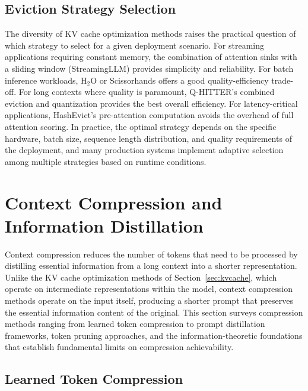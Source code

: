 \documentclass[11pt,letterpaper]{article}
\begin{document}
\subsection{Eviction Strategy Selection}

The diversity of KV cache optimization methods raises the practical question of which strategy to select for a given deployment scenario. For streaming applications requiring constant memory, the combination of attention sinks with a sliding window (StreamingLLM) provides simplicity and reliability. For batch inference workloads, H$_2$O or Scissorhands offers a good quality-efficiency trade-off. For long contexts where quality is paramount, Q-HITTER's combined eviction and quantization provides the best overall efficiency. For latency-critical applications, HashEvict's pre-attention computation avoids the overhead of full attention scoring. In practice, the optimal strategy depends on the specific hardware, batch size, sequence length distribution, and quality requirements of the deployment, and many production systems implement adaptive selection among multiple strategies based on runtime conditions.


\section{Context Compression and Information Distillation}
\label{sec:compression}

Context compression reduces the number of tokens that need to be processed by distilling essential information from a long context into a shorter representation. Unlike the KV cache optimization methods of Section~\ref{sec:kvcache}, which operate on intermediate representations within the model, context compression methods operate on the input itself, producing a shorter prompt that preserves the essential information content of the original. This section surveys compression methods ranging from learned token compression to prompt distillation frameworks, token pruning approaches, and the information-theoretic foundations that establish fundamental limits on compression achievability.

\subsection{Learned Token Compression}
\end{document}

